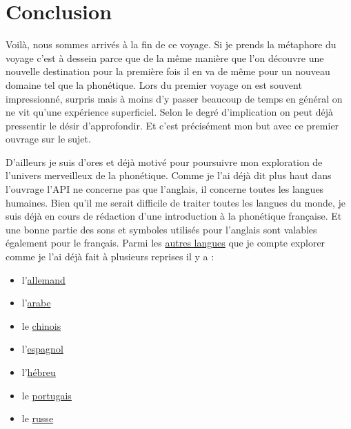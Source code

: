 \part{Conclusion}\label{chap:conc}

Voilà, nous sommes arrivés à la fin de ce voyage. Si je prends la
métaphore du voyage c'est à dessein parce que de la même manière que
l'on découvre une nouvelle destination pour la première fois il en va
de même pour un nouveau domaine tel que la phonétique. Lors du premier
voyage on est souvent impressionné, surpris mais à moins d'y passer
beaucoup de temps en général on ne vit qu'une expérience
superficiel. Selon le degré d'implication on peut déjà pressentir le
désir d'approfondir. Et c'est précisément mon but avec ce premier
ouvrage sur le sujet.

D'ailleurs je suis d'ores et déjà motivé pour poursuivre mon
exploration de l'univers merveilleux de la phonétique. Comme je l'ai
déjà dit plus haut dans l'ouvrage l'API ne concerne pas que l'anglais,
il concerne toutes les langues humaines. Bien qu'il me serait
difficile de traiter toutes les langues du monde, je suis déjà en
cours de rédaction d'une introduction à la phonétique française. Et
une bonne partie des sons et symboles utilisés pour l'anglais sont
valables également pour le français. Parmi les
\href{https://www.youtube.com/playlist?list=PLfKvL-VUSKAnkBk88BAb3oq1MlGVnhwcY}{autres
  langues} que je compte explorer comme je l'ai déjà fait à plusieurs
reprises il y a :
\begin{itemize}
  \item  l'\href{https://www.youtube.com/playlist?list=PLfKvL-VUSKAnM9MWJT9F1z1QZTdb73i7r}{allemand}
  \item
    l'\href{https://www.youtube.com/playlist?list=PLfKvL-VUSKAkXu2x3Fp74QxxYUVP43haA}{arabe}
  \item le
    \href{https://www.youtube.com/playlist?list=PLfKvL-VUSKAl4R0Mh7sKvQjqCsiEEa6D9}{chinois}
  \item
    l'\href{https://www.youtube.com/playlist?list=PLfKvL-VUSKAm_p6ikI_pTbxNuHco73REt}{espagnol}
  \item
    l'\href{https://www.youtube.com/playlist?list=PLfKvL-VUSKAkbDhpbtXc7RdroMBBeTJx0}{hébreu}
  \item le
    \href{https://www.youtube.com/playlist?list=PLfKvL-VUSKAn0zUUPYsMDd8_1J_UtfRxh}{portugais}
  \item le \href{https://www.youtube.com/playlist?list=PLfKvL-VUSKAk0YrJ3rV6cBj-w6rNCeOJB}{russe}
  \end{itemize}

